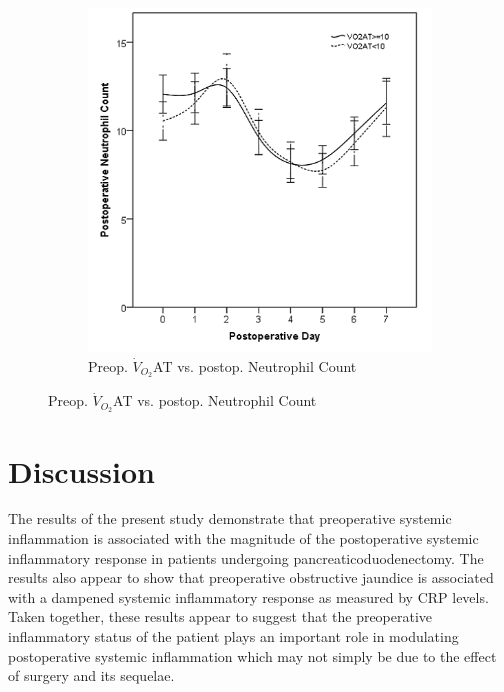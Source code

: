 \begin{figure}[p]
	\vspace{1cm}
		

	\begin{subfigure}{0.48\textwidth}
		\centering
		\includegraphics[width=\textwidth]{Figures/sirs_at_neut}
		\caption{Preop. $\dot{V}_{O_2}$AT vs. postop. Neutrophil Count}
		\label{fig:sirs_at_neut}
	\end{subfigure}	
\end{figure}





\clearpage
\section{Discussion}

The results of the present study demonstrate that preoperative systemic inflammation is associated with the magnitude of the postoperative systemic inflammatory response  in patients undergoing pancreaticoduodenectomy. 
The results also appear to show that preoperative obstructive jaundice is associated with a dampened systemic inflammatory response as measured by CRP levels. 
Taken together, these results appear to suggest that the preoperative inflammatory status of the patient plays an important role in modulating postoperative systemic inflammation which may not simply be due to the effect of surgery and its sequelae.

